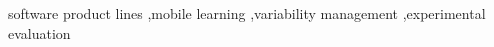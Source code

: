 \documentclass[preprint,12pt]{elsarticle}
\begin{document}
\begin{frontmatter}
\begin{keyword}
software product lines \sep mobile learning \sep variability management \sep experimental evaluation



\end{keyword}

\end{frontmatter}



















\end{document}
